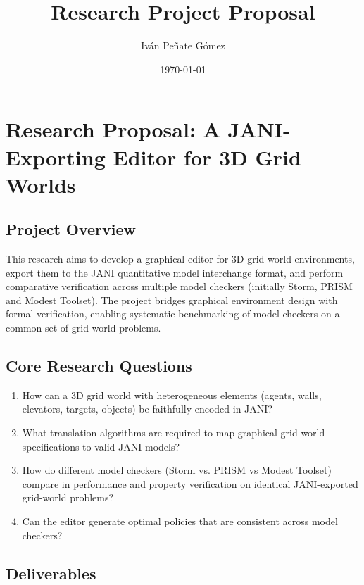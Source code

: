 \documentclass{report}
\title{Research Project Proposal}
\author{Iván Peñate Gómez}
\date{\today}
\begin{document}
\maketitle

\chapter*{Research Proposal: A JANI-Exporting Editor for 3D Grid Worlds}

\section*{Project Overview}

This research aims to develop a graphical editor for 3D grid-world environments, export them to the JANI quantitative model interchange format, and perform comparative verification across multiple model checkers (initially Storm, PRISM and Modest Toolset). The project bridges graphical environment design with formal verification, enabling systematic benchmarking of model checkers on a common set of grid-world problems.

\section*{Core Research Questions}

\begin{enumerate}
    \item How can a 3D grid world with heterogeneous elements (agents, walls, elevators, targets, objects) be faithfully encoded in JANI?
    \item What translation algorithms are required to map graphical grid-world specifications to valid JANI models?
    \item How do different model checkers (Storm vs. PRISM vs Modest Toolset) compare in performance and property verification on identical JANI-exported grid-world problems?
    \item Can the editor generate optimal policies that are consistent across model checkers?
\end{enumerate}

\section*{Deliverables}
\end{document}

